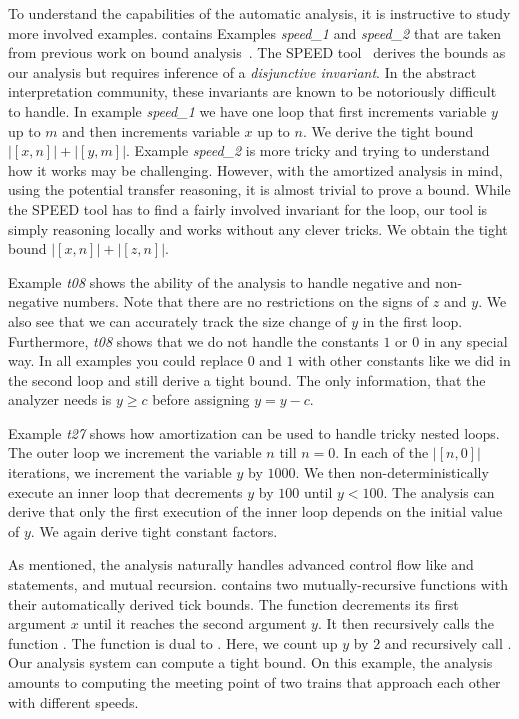 \documentclass[nocopyrightspace,preprint]{sigplanconf}
\newcommand{\pref}[1]{\prettyref{#1}}
\begin{document}
To understand the capabilities of the automatic analysis, it is
instructive to study more involved examples.  \pref{fig:ex_list}
contains Examples \emph{speed\_1} and \emph{speed\_2} that are taken
from previous work on bound analysis~\cite{GulwaniMC09}.  The SPEED
tool~\cite{GulwaniMC09} derives the bounds as our analysis but
requires inference of a \emph{disjunctive invariant}.  In the abstract
interpretation community, these invariants are known to be notoriously
difficult to handle.
%
In example \emph{speed\_1} we have one loop that first increments
variable $y$ up to $m$ and then increments variable $x$ up to $n$.  We
derive the tight bound $|[x, n]| + |[y, m]|$.
%
Example \emph{speed\_2} is more tricky and trying to understand how it
works may be challenging.  However, with the amortized analysis in
mind, using the potential transfer reasoning, it is almost trivial to
prove a bound.  While the SPEED tool has to find a fairly
involved invariant for the loop, our tool is simply reasoning locally
and works without any clever tricks. We obtain the tight bound $|[x,
n]| + |[z, n]|$.

Example \emph{t08} shows the ability of the analysis to handle
negative and non-negative numbers.  Note that there are no
restrictions on the signs of $z$ and $y$.  We also see that we can
accurately track the size change of $y$ in the first loop.
Furthermore, \emph{t08} shows that we do not handle the constants $1$
or $0$ in any special way.  In all examples you could replace $0$ and
$1$ with other constants like we did in the second loop and still
derive a tight bound.  The only information, that the analyzer needs
is $y \geq c$ before assigning $y = y - c$.

Example \emph{t27} shows how amortization can be used to handle tricky
nested loops.  The outer loop we increment the variable $n$ till $n =
0$.  In each of the $|[n,0]|$ iterations, we increment the variable
$y$ by $1000$.  We then non-deterministically execute an inner loop
that decrements $y$ by $100$ until $y<100$.  The analysis can derive
that only the first execution of the inner loop depends on the initial
value of $y$.  We again derive tight constant factors.

As mentioned, the analysis naturally handles advanced control flow
like  and  statements, and mutual recursion.
\pref{fig:ex_rec} contains two mutually-recursive functions with their
automatically derived tick bounds.  The function 
decrements its first argument $x$ until it reaches the second argument
$y$. It then recursively calls the function .  The
function  is dual to .  Here, we
count up $y$ by $2$ and recursively call .  Our
analysis system can compute a tight bound.  On this example, the
analysis amounts to computing the meeting point of two trains that
approach each other with different speeds.
\end{document}
